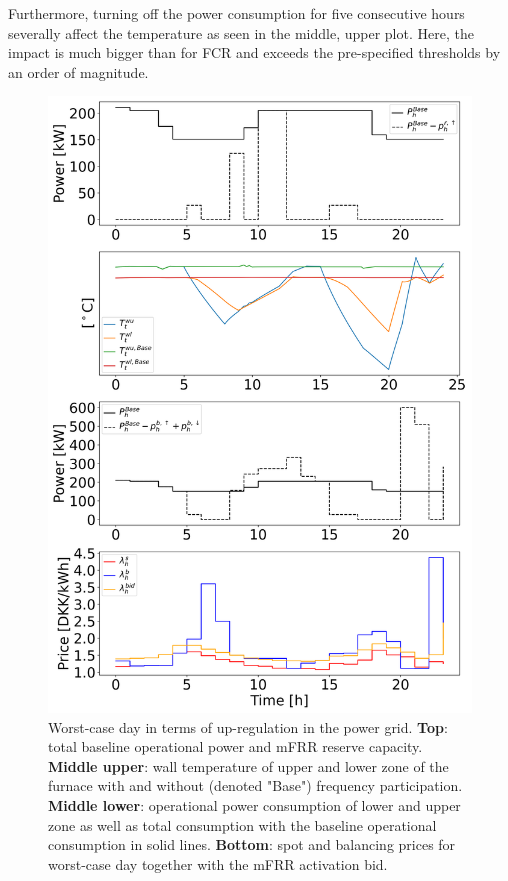 \documentclass[lettersize,journal]{IEEEtran}
\begin{document}
Furthermore, turning off the power consumption for five consecutive hours severally affect the temperature as seen in the middle, upper plot. Here, the impact is much bigger than for FCR and exceeds the pre-specified thresholds by an order of magnitude.

\begin{figure}[t]
    \centering
    \includegraphics[width=\columnwidth]{figures/mfrr_single_case.png}
    \caption{Worst-case day in terms of up-regulation in the power grid. \textbf{Top}: total baseline operational power and mFRR reserve capacity. \textbf{Middle upper}: wall temperature of upper and lower zone of the furnace with and without (denoted "Base") frequency participation. \textbf{Middle lower}: operational power consumption of lower and upper zone as well as total consumption with the baseline operational consumption in solid lines. \textbf{Bottom}: spot and balancing prices for worst-case day together with the mFRR activation bid.}
    \label{fig:mfrr_single_case}
\end{figure}
\end{document}
